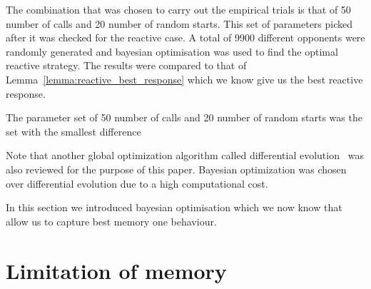 \documentclass[10pt]{article}
\begin{document}
The combination that was chosen to carry out the empirical trials is that
of 50 number of calls and 20 number of random starts. This set of parameters
picked after it was checked for the reactive case. A total of 9900 different
opponents were randomly generated and bayesian optimisation was used to find the optimal
reactive strategy. The results were compared to that of Lemma~\ref{lemma:reactive_best_response}
which we know give us the best reactive response.

The parameter set of 50 number of calls and 20 number of random starts was the
set with the smallest difference

Note that another global optimization algorithm called differential evolution~\cite{Storn1997}
was also reviewed for the purpose of this paper. Bayesian optimization was
chosen over differential evolution due to a high computational cost.

In this section we introduced bayesian optimisation which we now know that
allow us to capture best memory one behaviour.


\section{Limitation of memory}







\end{document}
